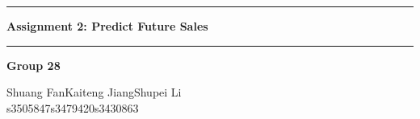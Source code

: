 \documentclass{article}
\begin{document}
\noindent\rule{\textwidth}{1pt}
\begin{center}
    \LARGE \textbf{Assignment 2: Predict Future Sales}
\end{center}
\noindent\rule{\textwidth}{0.5pt}
\begin{center}
    \textbf{Group 28}\par
    \vspace{0.3cm}
Shuang Fan\phantom{space}Kaiteng Jiang\phantom{space}Shupei Li\\
s3505847\phantom{spacespac}s3479420\phantom{spacespa}s3430863
\end{center}
\end{document}
